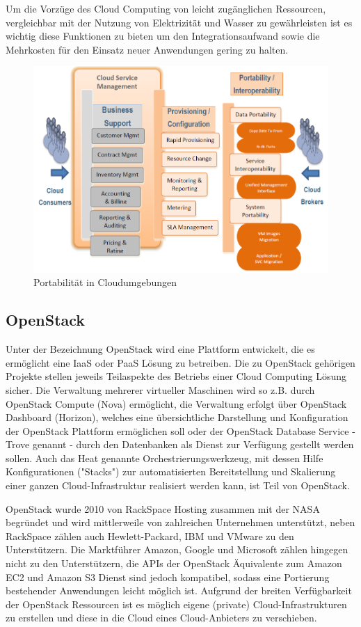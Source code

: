 Um die Vorzüge des Cloud Computing von leicht zugänglichen Ressourcen, vergleichbar mit der Nutzung von Elektrizität und Wasser zu gewährleisten ist es wichtig diese Funktionen zu bieten um den Integrationsaufwand sowie die Mehrkosten für den Einsatz neuer Anwendungen gering zu halten.

\begin{figure}
	\centering
	\includegraphics[width=0.8\linewidth]{images/portability}
	\caption{Portabilität in Cloudumgebungen}
	\label{fig:portability}
\end{figure}

\subsection{OpenStack}
Unter der Bezeichnung OpenStack wird eine Plattform entwickelt, die es ermöglicht eine IaaS oder PaaS Lösung zu betreiben. Die zu OpenStack gehörigen Projekte stellen jeweils Teilaspekte des Betriebs einer Cloud Computing Lösung sicher. Die Verwaltung mehrerer virtueller Maschinen wird so z.B. durch OpenStack Compute (Nova) ermöglicht, die Verwaltung erfolgt über OpenStack Dashboard (Horizon), welches eine übersichtliche Darstellung und Konfiguration der OpenStack Plattform ermöglichen soll oder der OpenStack Database Service - Trove genannt - durch den Datenbanken als Dienst zur Verfügung gestellt werden sollen. Auch das Heat genannte Orchestrierungswerkzeug, mit dessen Hilfe Konfigurationen ("Stacks") zur automatisierten Bereitstellung und Skalierung einer ganzen Cloud-Infrastruktur realisiert werden kann, ist Teil von OpenStack.

OpenStack wurde 2010 von RackSpace Hosting zusammen mit der NASA begründet und wird mittlerweile von zahlreichen Unternehmen unterstützt, neben RackSpace zählen auch Hewlett-Packard, IBM und VMware zu den Unterstützern. Die Marktführer Amazon, Google und Microsoft zählen hingegen nicht zu den Unterstützern, die APIs der OpenStack Äquivalente zum Amazon EC2 und Amazon S3 Dienst sind jedoch kompatibel, sodass eine Portierung bestehender Anwendungen leicht möglich ist. Aufgrund der breiten Verfügbarkeit der OpenStack Ressourcen ist es möglich eigene (private) Cloud-Infrastrukturen zu erstellen und diese in die Cloud eines Cloud-Anbieters zu verschieben.

